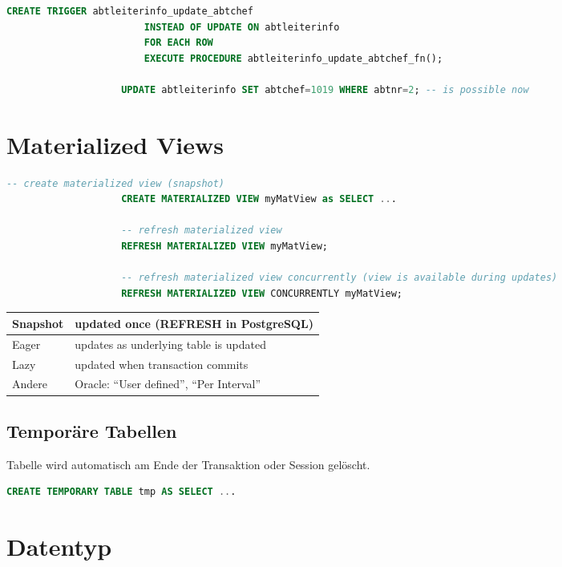 \documentclass[a4paper, landscape, 8pt]{scrartcl}
\begin{document}
\begin{multicols*}{4}
\begin{lstlisting}[language=sql]
                    CREATE TRIGGER abtleiterinfo_update_abtchef
                        INSTEAD OF UPDATE ON abtleiterinfo
                        FOR EACH ROW
                        EXECUTE PROCEDURE abtleiterinfo_update_abtchef_fn();

                    UPDATE abtleiterinfo SET abtchef=1019 WHERE abtnr=2; -- is possible now
        \end{lstlisting}

        \section{Materialized Views}
        \begin{lstlisting}[language=sql]
                    -- create materialized view (snapshot)
                    CREATE MATERIALIZED VIEW myMatView as SELECT ...

                    -- refresh materialized view
                    REFRESH MATERIALIZED VIEW myMatView;

                    -- refresh materialized view concurrently (view is available during updates)
                    REFRESH MATERIALIZED VIEW CONCURRENTLY myMatView;
        \end{lstlisting}

        \begin{tabularx}{\columnwidth}{l X}
            Snapshot & updated once (REFRESH in PostgreSQL) \\
            \hline
            Eager & updates as underlying table is updated \\
            \hline
            Lazy & updated when transaction commits \\
            \hline
            Andere & Oracle: \enquote{User defined}, \enquote{Per Interval}
        \end{tabularx}

        \subsection{Temporäre Tabellen}
        Tabelle wird automatisch am Ende der Transaktion oder Session gelöscht.
        \begin{lstlisting}[language=sql]
                    CREATE TEMPORARY TABLE tmp AS SELECT ...
        \end{lstlisting}

        \section{Datentyp}

\end{multicols*}
\end{document}
